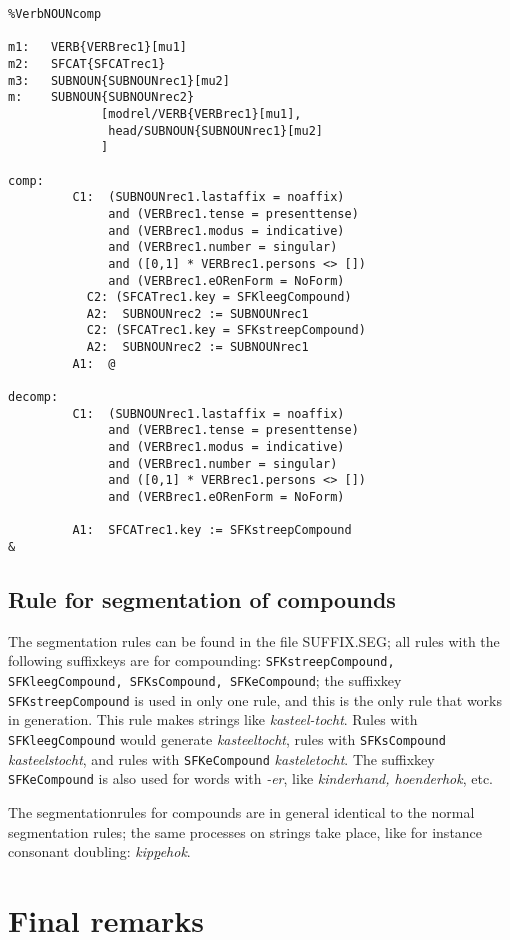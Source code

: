 \begin{verbatim}
%VerbNOUNcomp

m1:   VERB{VERBrec1}[mu1]
m2:   SFCAT{SFCATrec1}
m3:   SUBNOUN{SUBNOUNrec1}[mu2]
m:    SUBNOUN{SUBNOUNrec2}
             [modrel/VERB{VERBrec1}[mu1],
              head/SUBNOUN{SUBNOUNrec1}[mu2]
             ]

comp:
         C1:  (SUBNOUNrec1.lastaffix = noaffix)
              and (VERBrec1.tense = presenttense)
              and (VERBrec1.modus = indicative)
              and (VERBrec1.number = singular)
              and ([0,1] * VERBrec1.persons <> [])
              and (VERBrec1.eORenForm = NoForm)
           C2: (SFCATrec1.key = SFKleegCompound) 
           A2:  SUBNOUNrec2 := SUBNOUNrec1
           C2: (SFCATrec1.key = SFKstreepCompound) 
           A2:  SUBNOUNrec2 := SUBNOUNrec1
         A1:  @

decomp:
         C1:  (SUBNOUNrec1.lastaffix = noaffix)
              and (VERBrec1.tense = presenttense)
              and (VERBrec1.modus = indicative)
              and (VERBrec1.number = singular)
              and ([0,1] * VERBrec1.persons <> [])
              and (VERBrec1.eORenForm = NoForm)

         A1:  SFCATrec1.key := SFKstreepCompound
&
\end{verbatim}

\newpage
\subsection{Rule for segmentation of compounds}

The segmentation rules can be found in the file SUFFIX.SEG; all rules with the 
following suffixkeys are for compounding:
{\tt SFKstreepCompound, SFKleegCompound, SFKsCompound, SFKeCompound};
the suffixkey {\tt SFKstreepCompound} is used in only one rule, and this is the
only rule that works in generation. This rule makes strings like 
{\em kasteel-tocht}. Rules with {\tt SFKleegCompound} would generate 
{\em kasteeltocht}, rules with {\tt SFKsCompound} {\em kasteelstocht}, and rules
with {\tt SFKeCompound} {\em kasteletocht}. The suffixkey {\tt SFKeCompound} 
is also used for words with {\em -er}, like {\em kinderhand, hoenderhok}, etc.

The segmentationrules for compounds are in general identical to the normal 
segmentation
rules; the same processes on strings take place, like for instance consonant
doubling: {\em kip\underline{p}ehok}.

\section{Final remarks}

